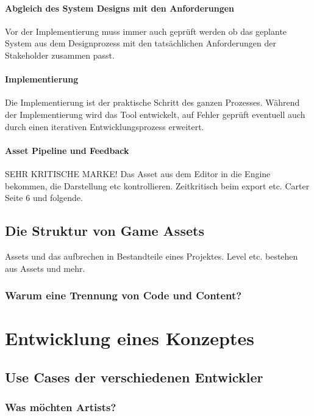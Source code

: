 \documentclass[pagesize, paper=a4, fontsize=12pt,titlepage=true, headings=small, headnosepline, abstractoff, liststotoc, nochapterprefix, plainheadsepline, twoside]{scrreprt}
\begin{document}
\subsubsection{Abgleich des System Designs mit den Anforderungen}
Vor der Implementierung muss immer auch geprüft werden ob das geplante System aus dem Designprozess mit den tatsächlichen Anforderungen der Stakeholder zusammen passt.

\subsubsection{Implementierung}
Die Implementierung ist der praktische Schritt des ganzen Prozesses. Während der Implementierung wird das Tool entwickelt, auf Fehler geprüft eventuell auch durch einen iterativen Entwicklungsprozess erweitert.

\subsubsection{Asset Pipeline und Feedback}
SEHR KRITISCHE MARKE! Das Asset aus dem Editor in die Engine bekommen, die Darstellung etc kontrollieren.
Zeitkritisch beim export etc.
Carter Seite 6 und folgende.

\section{Die Struktur von Game Assets}
Assets und das aufbrechen in Bestandteile eines Projektes. Level etc. bestehen aus Assets und mehr.
\subsection{Warum eine Trennung von Code und Content?}

\chapter{Entwicklung eines Konzeptes}

\section{Use Cases der verschiedenen Entwickler}
\subsection{Was möchten Artists?}
\end{document}
